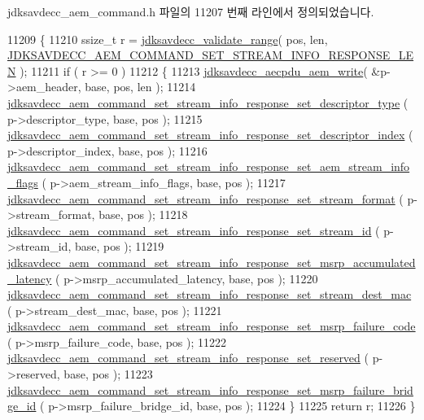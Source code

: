 jdksavdecc\+\_\+aem\+\_\+command.\+h 파일의 11207 번째 라인에서 정의되었습니다.


\begin{DoxyCode}
11209 \{
11210     ssize\_t r = \hyperlink{group__util_ga9c02bdfe76c69163647c3196db7a73a1}{jdksavdecc\_validate\_range}( pos, len, 
      \hyperlink{group__command__set__stream__info__response_gaebff86b0d3ebae556fa3978476aafbf3}{JDKSAVDECC\_AEM\_COMMAND\_SET\_STREAM\_INFO\_RESPONSE\_LEN} );
11211     \textcolor{keywordflow}{if} ( r >= 0 )
11212     \{
11213         \hyperlink{group__aecpdu__aem_gad658e55771cce77cecf7aae91e1dcbc5}{jdksavdecc\_aecpdu\_aem\_write}( &p->aem\_header, base, pos, len );
11214         \hyperlink{group__command__set__stream__info__response_ga1a2030f0d3c5afe40adb9ba8f2c4e601}{jdksavdecc\_aem\_command\_set\_stream\_info\_response\_set\_descriptor\_type}
      ( p->descriptor\_type, base, pos );
11215         \hyperlink{group__command__set__stream__info__response_ga2f864a84f4004dae617a9f058a20e0e5}{jdksavdecc\_aem\_command\_set\_stream\_info\_response\_set\_descriptor\_index}
      ( p->descriptor\_index, base, pos );
11216         
      \hyperlink{group__command__set__stream__info__response_gacbde797a81de40fbe40ceed5bf02cd9d}{jdksavdecc\_aem\_command\_set\_stream\_info\_response\_set\_aem\_stream\_info\_flags}
      ( p->aem\_stream\_info\_flags, base, pos );
11217         \hyperlink{group__command__set__stream__info__response_gaef64a7d1a863402c243688e2221b84f5}{jdksavdecc\_aem\_command\_set\_stream\_info\_response\_set\_stream\_format}
      ( p->stream\_format, base, pos );
11218         \hyperlink{group__command__set__stream__info__response_gafddb263e60e82aafa1e4082d67c342d9}{jdksavdecc\_aem\_command\_set\_stream\_info\_response\_set\_stream\_id}
      ( p->stream\_id, base, pos );
11219         
      \hyperlink{group__command__set__stream__info__response_gaee7fb46512887a64189a4f01113978d2}{jdksavdecc\_aem\_command\_set\_stream\_info\_response\_set\_msrp\_accumulated\_latency}
      ( p->msrp\_accumulated\_latency, base, pos );
11220         \hyperlink{group__command__set__stream__info__response_ga7ad9c17b4d7561792794b94ce49209f0}{jdksavdecc\_aem\_command\_set\_stream\_info\_response\_set\_stream\_dest\_mac}
      ( p->stream\_dest\_mac, base, pos );
11221         \hyperlink{group__command__set__stream__info__response_gab1ae640a9595bce4b531c43eb1b9e6b1}{jdksavdecc\_aem\_command\_set\_stream\_info\_response\_set\_msrp\_failure\_code}
      ( p->msrp\_failure\_code, base, pos );
11222         \hyperlink{group__command__set__stream__info__response_ga4bbe3a7abc533bef3ca6a62fa886a788}{jdksavdecc\_aem\_command\_set\_stream\_info\_response\_set\_reserved}
      ( p->reserved, base, pos );
11223         
      \hyperlink{group__command__set__stream__info__response_ga246c9e19f8dec3f5f0b6f6984907a623}{jdksavdecc\_aem\_command\_set\_stream\_info\_response\_set\_msrp\_failure\_bridge\_id}
      ( p->msrp\_failure\_bridge\_id, base, pos );
11224     \}
11225     \textcolor{keywordflow}{return} r;
11226 \}
\end{DoxyCode}


